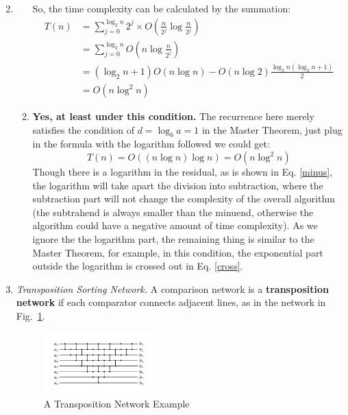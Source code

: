 \documentclass[12pt,a4paper]{article}
\makeatletter
\newtheorem*{solution}{Solution}
\theoremstyle{definition}
\renewenvironment{solution}[1][Solution] {\par\pushQED{\qed}\normalfont\topsep6\p@\@plus6\p@\relax\trivlist\item[\hskip\labelsep\bfseries#1\@addpunct{.}]\ignorespaces}{\popQED\endtrivlist\@endpefalse} \makeatother
\makeatother
\begin{document}
\begin{enumerate}
\begin{solution}
\begin{enumerate}
    So, the time complexity can be calculated by the summation:
    \begin{align}
        T(n) &= \sum_{j=0}^{\log_2 n} 2^j\times O\left(\frac{n}{2^j}\log\frac{n}{2^j}\right)\nonumber\\
        &=\sum_{j=0}^{\log_2 n} O\left(n\log \frac{n}{2^j}\right)\label{cross}\\
        &=(\log_2 n + 1)O(n\log n)-O(n\log 2)\frac{\log_2 n(\log_2 n+1)}{2}\label{minus}\\
        &= O(n\log^2 n)\nonumber
    \end{align}
    \item \textbf{Yes, at least under this condition.} The recurrence here merely satisfies the condition of $d=\log_b a=1$ in the Master Theorem, just plug in the formula with the logarithm followed we could get:
    \begin{equation*}
        T(n) = O((n\log n)\log n) = O(n\log^2 n)
    \end{equation*}
    Though there is a logarithm in the residual, as is shown in Eq. \eqref{minus}, the logarithm will take apart the division into subtraction, where the subtraction part will not change the complexity of the overall algorithm (the subtrahend is always smaller than the minuend, otherwise the algorithm could have a negative amount of time complexity). As we ignore the the logarithm part, the remaining thing is similar to the Master Theorem, for example, in this condition, the exponential part outside the logarithm is crossed out in Eq. \eqref{cross}.
\end{enumerate}
\end{solution}
\item
\textit{Transposition Sorting Network.} A comparison network is a \textbf{transposition network}  if each comparator connects adjacent lines, as in the network in Fig.~\ref{Fig-Transposition}.

\begin{figure}[H]
    \centering
    \includegraphics[width=0.4\textwidth]{img/Fig-Transposition.pdf}
    \caption{A Transposition Network Example}\label{Fig-Transposition}
\end{figure}


\end{enumerate}
\end{document}
